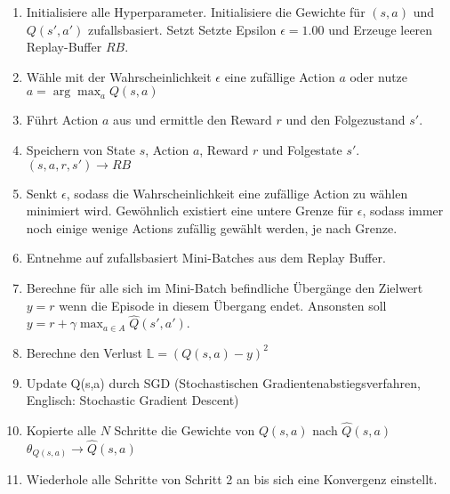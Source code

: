 \begin{enumerate}
	\item Initialisiere alle Hyperparameter. Initialisiere die Gewichte für $(s,a)$ und $Q(s',a')$ zufallsbasiert. Setzt Setzte Epsilon $\epsilon = 1.00$ und Erzeuge leeren Replay-Buffer $RB$.
	\item Wähle mit der Wahrscheinlichkeit $\epsilon$  eine zufällige Action $a$ oder nutze $a = \arg\max_{a} Q(s,a)$
	\item Führt Action $a$ aus und ermittle den Reward $r$ und den Folgezustand $s'$.
	\item Speichern von State $s$, Action $a$, Reward $r$ und Folgestate $s'$. $(s,a,r,s') \longrightarrow RB$
	\item Senkt $\epsilon$, sodass die Wahrscheinlichkeit eine zufällige Action zu wählen minimiert wird. Gewöhnlich existiert eine untere Grenze für $\epsilon$, sodass immer noch einige wenige Actions zufällig gewählt werden, je nach Grenze.
	\item Entnehme auf zufallsbasiert Mini-Batches aus dem Replay Buffer.
	\item Berechne für alle sich im Mini-Batch befindliche Übergänge den Zielwert $y = r$ wenn die Episode in diesem Übergang endet. Ansonsten soll $y = r + \gamma \max_{a \in A}\hat{Q}(s',a')$.
	\item Berechne den Verlust $\mathbb{L} = (Q(s,a) - y)^2$
	\item Update Q(s,a) durch SGD (Stochastischen Gradientenabstiegsverfahren, Englisch: Stochastic Gradient Descent)
	\item Kopierte alle $N$ Schritte die Gewichte von $Q(s,a)$ nach $\hat{Q}(s,a)$ $\theta_{Q(s,a)} \longrightarrow \hat{Q}(s,a)$
	\item Wiederhole alle Schritte von Schritt 2 an bis sich eine Konvergenz einstellt.
\end{enumerate}

